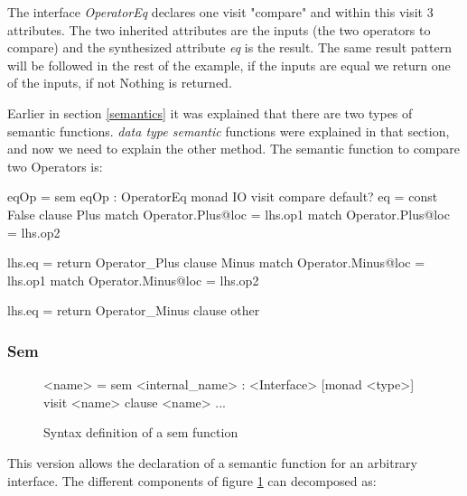 The interface \emph{OperatorEq} declares one visit "compare" and within this visit 3 attributes. The two inherited attributes are the inputs (the two operators to compare) and the synthesized attribute \emph{eq} is the result. The same result pattern will be followed in the rest of the example, if the inputs are equal we return one of the inputs, if not Nothing is returned.

Earlier in section \ref{semantics} it was explained that there are two types of semantic functions. \emph{data type semantic} functions were explained in that section, and now we need to explain the other method. The semantic function to compare two Operators is:

\begin{code}
{
eqOp = sem eqOp : OperatorEq monad IO
         visit compare
           default? eq = const False
           clause Plus
             match Operator.Plus@loc = lhs.op1
             match Operator.Plus@loc = lhs.op2
             
             lhs.eq = return Operator_Plus
           clause Minus
             match Operator.Minus@loc = lhs.op1
             match Operator.Minus@loc = lhs.op2

             lhs.eq = return Operator_Minus
           clause other
}
\end{code}

\subsubsection{Sem}
\begin{figure}[!h]
\begin{code}
<name> = sem <internal_name> : <Interface> [monad <type>]
          {visit <name>
             {clause <name>
                ...
             }
          }
\end{code}
\caption{Syntax definition of a sem function}
\label{sem:syntax}
\end{figure}

This version allows the declaration of a semantic function for an arbitrary interface. The different components of figure \ref{sem:syntax} can decomposed as:

